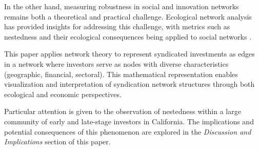 In the other hand, measuring robustness in social and innovation networks remains both a theoretical and practical challenge. Ecological network analysis has provided insights for addressing this challenge, with metrics such as nestedness and their ecological consequences being applied to social networks \cite{Theophile2024}.

This paper applies network theory to represent syndicated investments as edges in a network where investors serve as nodes with diverse characteristics (geographic, financial, sectoral). This mathematical representation enables visualization and interpretation of syndication network structures through both ecological and economic perspectives.

Particular attention is given to the observation of nestedness within a large community of early and late-stage investors in California. The implications and potential consequences of this phenomenon are explored in the \textit{Discussion and Implications} section of this paper.